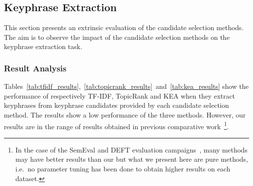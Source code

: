 

  \subsection{Keyphrase Extraction}
  \label{subsec:keyphrase_extraction}
    This section presents an extrinsic evaluation of the candidate selection
    methods. The aim is to observe the impact of the candidate selection
    methods on the keyphrase extraction task.

    \subsubsection{Result Analysis}
    \label{subsubsec:candidate_extraction_result_analysis}
      Tables~\ref{tab:tfidf_results},~\ref{tab:topicrank_results}~and~\ref{tab:kea_results}
      show the performance of respectively TF-IDF, TopicRank and KEA when
      they extract keyphrases from keyphrase candidates provided by each
      candidate selection method. The results show a low performance of the
      three methods. However, our results are in the range of results obtained
      in previous comparative
      work~\cite{hassan2010conundrums,kim2010semeval,paroubek2012deft}\footnote{In
      the case of the SemEval and DEFT evaluation
      campaigns~\cite{kim2010semeval,paroubek2012deft}, many methods may have
      better results than our but what we present here are pure methods,
      i.e.~no parameter tuning has been done to obtain higher results on each
      dataset. }.
